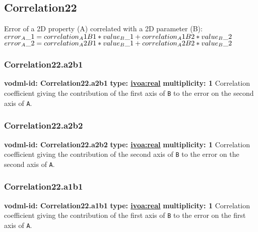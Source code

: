   \subsection{Correlation22}
  \label{sect:Correlation22}
    Error of a 2D property (A) correlated with a 2D parameter (B): $error\\_A\_1 = correlation\\_A1B1 * value\\_B\_1 + correlation\\_A1B2 * value\\_B\_2$ $error\\_A\_2 = correlation\\_A2B1 * value\\_B\_1 + correlation\\_A2B2 * value\\_B\_2$

    \subsubsection{Correlation22.a2b1}
      \textbf{vodml-id: Correlation22.a2b1} \newline
      \textbf{type: \hyperref[sect:ivoa]{ivoa:real}} \newline
      \textbf{multiplicity: 1} \newline 
      Correlation coefficient giving the contribution of the first axis of \texttt{B} to the error on the second axis of \texttt{A}.

    \subsubsection{Correlation22.a2b2}
      \textbf{vodml-id: Correlation22.a2b2} \newline
      \textbf{type: \hyperref[sect:ivoa]{ivoa:real}} \newline
      \textbf{multiplicity: 1} \newline 
      Correlation coefficient giving the contribution of the second axis of \texttt{B} to the error on the second axis of \texttt{A}.

    \subsubsection{Correlation22.a1b1}
      \textbf{vodml-id: Correlation22.a1b1} \newline
      \textbf{type: \hyperref[sect:ivoa]{ivoa:real}} \newline
      \textbf{multiplicity: 1} \newline 
      Correlation coefficient giving the contribution of the first axis of \texttt{B} to the error on the first axis of \texttt{A}.

